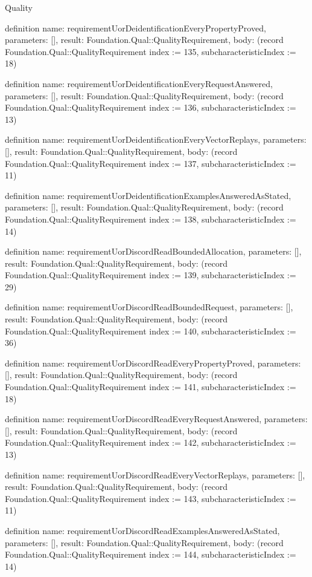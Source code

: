 \begin{lexlean}{Quality}
\begin{semanticmodule}
definition{
  name: requirementUorDeidentificationEveryPropertyProved,
  parameters: [],
  result: Foundation.Qual::QualityRequirement,
  body: (record Foundation.Qual::QualityRequirement {index := 135, subcharacteristicIndex := 18})
}

definition{
  name: requirementUorDeidentificationEveryRequestAnswered,
  parameters: [],
  result: Foundation.Qual::QualityRequirement,
  body: (record Foundation.Qual::QualityRequirement {index := 136, subcharacteristicIndex := 13})
}

definition{
  name: requirementUorDeidentificationEveryVectorReplays,
  parameters: [],
  result: Foundation.Qual::QualityRequirement,
  body: (record Foundation.Qual::QualityRequirement {index := 137, subcharacteristicIndex := 11})
}

definition{
  name: requirementUorDeidentificationExamplesAnsweredAsStated,
  parameters: [],
  result: Foundation.Qual::QualityRequirement,
  body: (record Foundation.Qual::QualityRequirement {index := 138, subcharacteristicIndex := 14})
}

definition{
  name: requirementUorDiscordReadBoundedAllocation,
  parameters: [],
  result: Foundation.Qual::QualityRequirement,
  body: (record Foundation.Qual::QualityRequirement {index := 139, subcharacteristicIndex := 29})
}

definition{
  name: requirementUorDiscordReadBoundedRequest,
  parameters: [],
  result: Foundation.Qual::QualityRequirement,
  body: (record Foundation.Qual::QualityRequirement {index := 140, subcharacteristicIndex := 36})
}

definition{
  name: requirementUorDiscordReadEveryPropertyProved,
  parameters: [],
  result: Foundation.Qual::QualityRequirement,
  body: (record Foundation.Qual::QualityRequirement {index := 141, subcharacteristicIndex := 18})
}

definition{
  name: requirementUorDiscordReadEveryRequestAnswered,
  parameters: [],
  result: Foundation.Qual::QualityRequirement,
  body: (record Foundation.Qual::QualityRequirement {index := 142, subcharacteristicIndex := 13})
}

definition{
  name: requirementUorDiscordReadEveryVectorReplays,
  parameters: [],
  result: Foundation.Qual::QualityRequirement,
  body: (record Foundation.Qual::QualityRequirement {index := 143, subcharacteristicIndex := 11})
}

definition{
  name: requirementUorDiscordReadExamplesAnsweredAsStated,
  parameters: [],
  result: Foundation.Qual::QualityRequirement,
  body: (record Foundation.Qual::QualityRequirement {index := 144, subcharacteristicIndex := 14})
}


\end{semanticmodule}
\end{lexlean}
